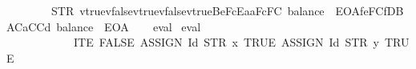 \begin{isabellebody}
\ \ \ \ \ \ \ {\isacharequal}{\kern0pt}\ STR\ {\isacharprime}{\kern0pt}{\isacharprime}{\kern0pt}v{}{\isacharbrackleft}{\kern0pt}{}{\isacharbrackright}{\kern0pt}{\isacharequal}{\kern0pt}{\isacharequal}{\kern0pt}true{\isasymnewline}v{}{\isacharbrackleft}{\kern0pt}{}{\isacharbrackright}{\kern0pt}{\isacharequal}{\kern0pt}{\isacharequal}{\kern0pt}false{\isasymnewline}v{}{\isacharbrackleft}{\kern0pt}{}{\isacharbrackright}{\kern0pt}{\isacharequal}{\kern0pt}{\isacharequal}{\kern0pt}true{\isasymnewline}v{}{\isacharbrackleft}{\kern0pt}{}{\isacharbrackright}{\kern0pt}{\isacharequal}{\kern0pt}{\isacharequal}{\kern0pt}false{\isasymnewline}v{}{\isacharbrackleft}{\kern0pt}{}{\isacharbrackright}{\kern0pt}{\isacharequal}{\kern0pt}{\isacharequal}{\kern0pt}true{\isasymnewline}{}{}{}Be{}{}{}{}FcEa{}{}aF{}{}{}{}{}{}{}{}{}c{}{}F{}{}{}{}{}{}C{}{}{}{\isacharcolon}{\kern0pt}\ balance{\isacharequal}{\kern0pt}{\isacharequal}{\kern0pt}{}{}{}\ {\isacharminus}{\kern0pt}\ EOA{\isasymnewline}{}{}{}f{}e{}F{}{}{}{}{}C{}{}f{}DB{}AC{}{}{}{}{}a{}CC{}{}{}{}{}d{}{}{\isacharcolon}{\kern0pt}\ balance{\isacharequal}{\kern0pt}{\isacharequal}{\kern0pt}{}{}{}\ {\isacharminus}{\kern0pt}\ EOA{\isacharprime}{\kern0pt}{\isacharprime}{\kern0pt}{\isachardoublequoteclose}\isanewline
%
\isadelimproof
\ \ %
\endisadelimproof
%
\isatagproof
{}\isamarkupfalse%
\ eval%
\endisatagproof
{\isafoldproof}%
%
\isadelimproof
\isanewline
%
\endisadelimproof
\isanewline
{}\isamarkupfalse%
\ {\isachardoublequoteopen}eval{}\ {}{}{}{}\isanewline
\ \ \ \ \ \ \ \ \ \ \ \ {\isacharparenleft}{\kern0pt}ITE\ FALSE\ {\isacharparenleft}{\kern0pt}ASSIGN\ {\isacharparenleft}{\kern0pt}Id\ {\isacharparenleft}{\kern0pt}STR\ {\isacharprime}{\kern0pt}{\isacharprime}{\kern0pt}x{\isacharprime}{\kern0pt}{\isacharprime}{\kern0pt}{\isacharparenright}{\kern0pt}{\isacharparenright}{\kern0pt}\ TRUE{\isacharparenright}{\kern0pt}\ {\isacharparenleft}{\kern0pt}ASSIGN\ {\isacharparenleft}{\kern0pt}Id\ {\isacharparenleft}{\kern0pt}STR\ {\isacharprime}{\kern0pt}{\isacharprime}{\kern0pt}y{\isacharprime}{\kern0pt}{\isacharprime}{\kern0pt}{\isacharparenright}{\kern0pt}{\isacharparenright}{\kern0pt}\ TRUE{\isacharparenright}{\kern0pt}{\isacharparenright}{\kern0pt}\ \isanewline

\end{isabellebody}
